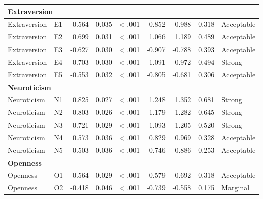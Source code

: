 \documentclass[
]{article}
\begin{document}
\begin{table}
\begin{tabular}[t]{l|l|r|r|l|r|r|>{}r|l}
\hline
\multicolumn{9}{l}{\textbf{Extraversion}}\\
\hline
\hspace{1em}Extraversion & E1 & 0.564 & 0.035 & < .001 & 0.852 & 0.988 & \textcolor[HTML]{27AE60}{0.318} & Acceptable\\
\hline
\hspace{1em}Extraversion & E2 & 0.699 & 0.031 & < .001 & 1.066 & 1.189 & \textcolor[HTML]{27AE60}{0.489} & Acceptable\\
\hline
\hspace{1em}Extraversion & E3 & -0.627 & 0.030 & < .001 & -0.907 & -0.788 & \textcolor[HTML]{27AE60}{0.393} & Acceptable\\
\hline
\hspace{1em}Extraversion & E4 & -0.703 & 0.030 & < .001 & -1.091 & -0.972 & \textcolor[HTML]{27AE60}{0.494} & Strong\\
\hline
\hspace{1em}Extraversion & E5 & -0.553 & 0.032 & < .001 & -0.805 & -0.681 & \textcolor[HTML]{27AE60}{0.306} & Acceptable\\
\hline
\multicolumn{9}{l}{\textbf{Neuroticism}}\\
\hline
\hspace{1em}Neuroticism & N1 & 0.825 & 0.027 & < .001 & 1.248 & 1.352 & \textcolor[HTML]{27AE60}{0.681} & Strong\\
\hline
\hspace{1em}Neuroticism & N2 & 0.803 & 0.026 & < .001 & 1.179 & 1.282 & \textcolor[HTML]{27AE60}{0.645} & Strong\\
\hline
\hspace{1em}Neuroticism & N3 & 0.721 & 0.029 & < .001 & 1.093 & 1.205 & \textcolor[HTML]{27AE60}{0.520} & Strong\\
\hline
\hspace{1em}Neuroticism & N4 & 0.573 & 0.036 & < .001 & 0.829 & 0.969 & \textcolor[HTML]{27AE60}{0.328} & Acceptable\\
\hline
\hspace{1em}Neuroticism & N5 & 0.503 & 0.036 & < .001 & 0.746 & 0.886 & \textcolor[HTML]{27AE60}{0.253} & Acceptable\\
\hline
\multicolumn{9}{l}{\textbf{Openness}}\\
\hline
\hspace{1em}Openness & O1 & 0.564 & 0.029 & < .001 & 0.579 & 0.692 & \textcolor[HTML]{27AE60}{0.318} & Acceptable\\
\hline
\hspace{1em}Openness & O2 & -0.418 & 0.046 & < .001 & -0.739 & -0.558 & \textcolor[HTML]{C0392B}{0.175} & Marginal\\

\end{tabular}
\end{table}
\end{document}
